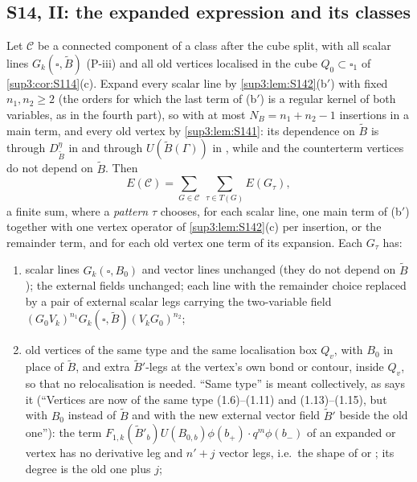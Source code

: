 
\subsection{S14, II: the expanded expression and its classes}\label{sup3:ssec:S14b}

\begin{lemma}\label{sup3:lem:S143}
Let $\mathcal C$ be a connected component of a class after the cube split, with all scalar lines $G_k(\square,\tilde B)$ (P-iii) and all old vertices localised in the cube $Q_0\subset\square_1$ of \cref{sup3:cor:S114}(c). Expand every scalar line by \cref{sup3:lem:S142}(b$'$) with fixed $n_1,n_2\ge2$ (the orders for which the last term of (b$'$) is a regular kernel of both variables, as in the fourth part), so with at most $N_B=n_1+n_2-1$ insertions in a main term, and every old vertex by \cref{sup3:lem:S141}: its dependence on $\tilde B$ is through $D^\eta_{\tilde B}$ in \cite[(1.8)--(1.9)]{Ba3} and through $U(\tilde B(\Gamma))$ in \cite[(1.13)--(1.15)]{Ba3}, while \cite[(1.6), (1.7), (1.10), (1.11)]{Ba3} and the counterterm vertices do not depend on $\tilde B$. Then
\[
E(\mathcal C)=\sum_{G\in\mathcal C}\ \sum_{\tau\in T(G)}E(G_\tau),
\]
a finite sum, where a \emph{pattern} $\tau$ chooses, for each scalar line, one main term of (b$'$) together with one vertex operator of \cref{sup3:lem:S142}(c) per insertion, or the remainder term, and for each old vertex one term of its expansion. Each $G_\tau$ has:
\begin{enumerate}[label=\textup{(\roman*)},nosep,leftmargin=*]
\item scalar lines $G_k(\square,B_0)$ and vector lines unchanged (they do not depend on $\tilde B$); the external fields unchanged; each line with the remainder choice replaced by a pair of external scalar legs carrying the two-variable field $(G_0V_k)^{n_1}G_k(\square,\tilde B)(V_kG_0)^{n_2}$;
\item old vertices of the same type and the same localisation box $Q_v$, with $B_0$ in place of $\tilde B$, and extra $\tilde B'$-legs at the vertex's own bond or contour, inside $Q_v$, so that no relocalisation is needed. ``Same type'' is meant collectively, as \cite[p.~433]{Ba3} says it (``Vertices are now of the same type (1.6)--(1.11) and (1.13)--(1.15), but with $B_0$ instead of $\tilde B$ and with the new external vector field $\tilde B'$ beside the old one''): the term $F_{1,k}(\tilde B'_b)U(B_{0,b})\phi(b_+)\cdot q^m\phi(b_-)$ of an expanded \cite[(1.8)]{Ba3} or \cite[(1.9)]{Ba3} vertex has no derivative leg and $n'+j$ vector legs, i.e.\ the shape of \cite[(1.10)]{Ba3} or \cite[(1.11)]{Ba3}; its degree is the old one plus $j$;

\end{enumerate}
\end{lemma}

